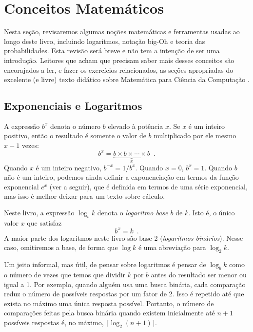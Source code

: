 
\section{Conceitos Matemáticos}
Nesta seção, revisaremos algumas noções matemáticas e ferramentas usadas 
ao longo deste livro, incluindo logaritmos, notação big-Oh e
teoria das probabilidades. Esta revisão será breve e não tem a intenção
de ser uma introdução. Leitores que acham que precisam saber mais desses conceitos
são encorajados a ler, e fazer os exercícios relacionados, as seções apropriadas
do excelente (e livre) texto didático sobre Matemática para Ciência da Computação
\cite{llm11}.

\subsection{Exponenciais e Logaritmos}

%
A expressão $b^x$ denota o número $b$ elevado à potência $x$.
Se $x$ é um inteiro positivo, então o resultado é somente o valor de $b$ multiplicado por ele mesmo $x-1$ vezes:
\[
    b^x = \underbrace{b\times b\times \cdots \times b}_{x} \enspace .
\]
Quando $x$ é um inteiro negativo, $b^{-x}=1/b^{x}$. 
Quando $x=0$, $b^x=1$.
Quando $b$ não é um inteiro, podemos ainda definir a exponenciação em termos da função exponencial 
$e^x$ (ver a seguir), que é definida em termos de uma série exponencial, mas isso é melhor deixar para um texto sobre cálculo. 

%
Neste livro, a expressão 
$\log_b k$ denota o \emph{logaritmo base $b$}
de $k$.  Isto é, o único valor $x$ que satisfaz 
\[
    b^{x} = k  \enspace .
\]
A maior parte dos logaritmos neste livro são base 2 (\emph{logaritmos binários}).
%
%
Nesse caso, omitiremos a base, de forma que 
$\log k$ é uma abreviação para 
$\log_2 k$.

Um jeito informal, mas útil, de pensar sobre logaritmos é pensar
de $\log_b k$ como o número de vezes que temos que dividir $k$ por $b$
antes do resultado ser menor ou igual a 1. Por exemplo, quando alguém usa uma
busca binária, cada comparação reduz o número de possíveis respostas por 
um fator de 2. Isso é repetido até que exista no máximo uma única resposta 
possível. Portanto, o número de comparações feitas pela busca binária 
quando existem inicialmente até $n+1$ possíveis respostas é, no máximo, 
$\lceil\log_2(n+1)\rceil$.

